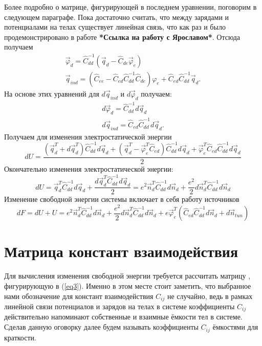 \documentclass[12pt,a4paper]{report}
\begin{document}
Более подробно о матрице, фигурирующей в последнем уравнении, поговорим в следующем параграфе. Пока достаточно считать, что между зарядами и потенциалами на телах существует линейная связь, что как раз и было продемонстрировано в работе \textbf{*Ссылка на работу с Ярославом*}. Отсюда получаем
\begin{equation}
  \begin{array}{l}
   \vec \varphi_d=\hat C^{-1}_{dd}
   (\vec{q}_d-\hat C_{de}\vec \varphi_e)\\
   \vec q_{ind}=(\hat C_{ee}-\hat C_{ed}\hat C^{-1}_{dd}\hat C_{de})\varphi_e+
   \hat C_{ed}\hat C^{-1}_{dd}\vec q_d.
  \end{array}
\end{equation}
На основе этих уравнений для $d\vec q_{ind}$ и 
$d\vec{\varphi}_d$ получаем:
\begin{equation}
  \begin{array}{l}
   d\vec \varphi_d=\hat C^{-1}_{dd}d\vec{q}_d\\
   d\vec q_{ind}=
   \hat C_{ed}\hat C^{-1}_{dd}d\vec q_d.
  \end{array}
\end{equation}
Получаем для изменения электростатической энергии
\begin{equation}
  dU = 
  \frac{(\vec{q}^T_d+d\vec{q}^T_d)\hat C^{-1}_{dd}d\vec{q}_d+
  (\vec{q}_d^T-\vec \varphi_e^T\hat C_{ed})\hat C^{-1}_{dd}d\vec{q}_d+
  \vec{\varphi}_e^T\hat C_{ed}\hat C^{-1}_{dd}d\vec q_d}{2}
\end{equation}
Окончательно изменения электростатической энергии:
\begin{equation}
  dU = \vec{q}^T_d\hat C^{-1}_{dd}d\vec{q}_d+
  \frac{d\vec{q}^T_d\hat C^{-1}_{dd}d\vec{q}_d}{2}=
  e^2\vec{n}^T_d\hat C^{-1}_{dd}d\vec{n}_d+
  \frac{e^2}{2}d\vec{n}^T_d\hat C^{-1}_{dd}d\vec{n}_d
\end{equation}
Изменение свободной энергии системы включает в себя работу источников
\begin{equation}\label{eq1}
 dF=dU + U=e^2\vec{n}^T_d\hat C^{-1}_{dd}d\vec{n}_d+
  \frac{e^2}{2}d\vec{n}^T_d\hat C^{-1}_{dd}d\vec{n}_d+
  e\vec \varphi_e^T(\hat C_{ed}\hat C^{-1}_{dd}d\vec{n}_d+d\vec{n}_{tun})
\end{equation}
\section{Матрица констант взаимодействия}
Для вычисления изменения свободной энергии требуется рассчитать матрицу , фигурирующую в (\ref{eq3}). Именно в этом месте стоит заметить, что выбранное нами обозначение для констант взаимодействия $C_{ij}$ не случайно, ведь в рамках линейной связи потенциалов и зарядов на телах в системе коэффициенты $C_{ij}$ действительно напоминают собственные и взаимные ёмкости тел в системе. Сделав данную оговорку далее будем называть коэффициенты $C_{ij}$ ёмкостями для краткости.%
\end{document}
